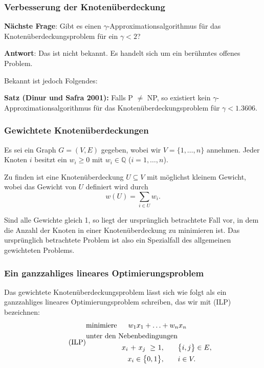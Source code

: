 \documentclass[smaller]{beamer}
\begin{document}
\begin{frame}
\frametitle{Verbesserung der Knotenüberdeckung}
\textbf{Nächste Frage}: Gibt es einen $\gamma$-Approximationsalgorithmus für das Knotenüberdeckungsproblem für ein $\gamma < 2$? \\ \vspace*{0.2cm}

\textbf{Antwort}: Das ist nicht bekannt. Es handelt sich um ein berühmtes offenes Problem. \\ \vspace*{0.2cm}

Bekannt ist jedoch Folgendes: \\ \vspace*{0.2cm}

\textbf{Satz (Dinur und Safra 2001):}
Falls P $\neq$ NP, so existiert kein $\gamma$-Approximationsalgorithmus für das Knotenüberdeckungsproblem für $\gamma < 1.3606$.
\end{frame}

\begin{frame}
\frametitle{Gewichtete Knotenüberdeckungen}
Es sei ein Graph $G=(V,E)$ gegeben, wobei wir $V = \big\{ 1,\ldots,n \big\}$ annehmen. Jeder Knoten $i$ besitzt ein  $w_i \geq 0$ mit $w_i \in \mathbb{Q}$ ($i=1,\ldots,n$). \\ \vspace*{0.2cm}

Zu finden ist eine Knotenüberdeckung $U \subseteq V$ mit möglichst kleinem Gewicht, wobei das Gewicht von $U$ definiert wird durch
\[
w(U) = \sum\limits_{i \in U}{w_i}.
\]

Sind alle Gewichte gleich 1, so liegt der ursprünglich betrachtete Fall vor, in dem die Anzahl der Knoten in einer Knotenüberdeckung zu minimieren ist. Das ursprünglich betrachtete Problem ist also ein Spezialfall des allgemeinen gewichteten Problems.
\end{frame}

\begin{frame}
\frametitle{Ein ganzzahliges lineares Optimierungsproblem}
Das gewichtete Knotenüberdeckungsproblem lässt sich wie folgt als ein \alert{ganzzahliges lineares Optimierungsproblem} schreiben, das wir mit (ILP) bezeichnen:
\begin{align}
\tag{ILP}
\begin{alignedat}{5}
& \text{minimiere } & \rlap{$w_1x_1 + \ldots + w_nx_n$} & & & & & \\
& \rlap{unter den Nebenbedingungen} & & & & & & \\
&&\ x_i &\ + &\ x_j &\ \geq &\ 1, & \qquad \big\{ i,j \big\} \in E, \\
&& & & & & \llap{$x_i \in \big\{ 0,1 \big\},$}  & \qquad i \in V.
\end{alignedat}
\end{align}
\end{frame}
\end{document}

